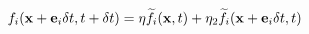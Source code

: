 \documentclass[10pt]{article}
\begin{document}
\[f_i(\bold{x}+\bold{e}_i\delta t,t+\delta t)=\eta\widetilde{f_i}(\bold{x},t)+\eta_2\widetilde{f_i}(\bold{x}+\bold{e}_i\delta t,t)\]
\end{document}
